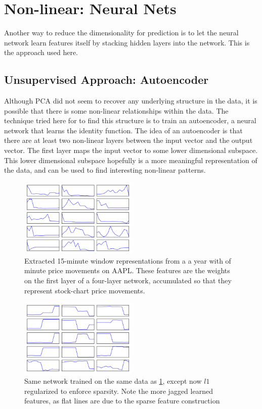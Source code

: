 \documentclass{article}
\begin{document}
\section{Non-linear: Neural Nets}

Another way to reduce the dimensionality for prediction is to let the
neural network learn features itself by stacking hidden layers into the network.
This is the approach used here. 

\subsection{Unsupervised Approach: Autoencoder}

Although PCA did not seem to recover any underlying structure in the 
data, it is possible that there is some non-linear relationships within
the data. The technique tried here for to find this structure is to
train an autoencoder, a neural network that learns the identity function.
The idea of an autoencoder is that there are at least two non-linear layers
between the input vector and the output vector. The first layer maps the
input vector to some lower dimensional subspace. This lower dimensional
subspace hopefully is a more meaningful representation of the data, and
can be used to find interesting non-linear patterns. 

\begin{figure}[h]
    \includegraphics[width=0.5\textwidth]{autoencoder_features}
    \caption{Extracted 15-minute window representations from a a year with of
    minute price movements on AAPL. These features are the weights on the first layer
    of a four-layer network, accumulated so that they represent stock-chart price
    movements.}
    \label{fig:autoencoder_features}
\end{figure}

\begin{figure}[h]
    \includegraphics[width=0.5\textwidth]{sparse_features}
    \caption{Same network trained on the same data as \ref{fig:autoencoder_features},
    except now $l1$ regularized to enforce sparsity. Note the more jagged learned
    features, as flat lines are due to the sparse feature construction}
    \label{fig:sparse_features}
\end{figure}
\end{document}
